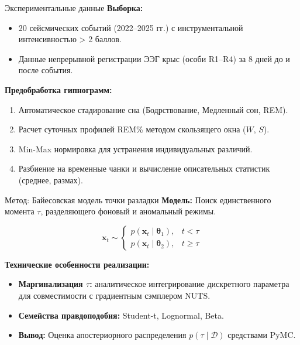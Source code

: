 \documentclass[12pt,aspectratio=169]{beamer}
\begin{document}
	\begin{frame}{Экспериментальные данные}
		\textbf{Выборка:}
		\begin{itemize}
			\item 20 сейсмических событий (2022--2025 гг.) с инструментальной интенсивностью > 2 баллов.
			\item Данные непрерывной регистрации ЭЭГ крыс (особи R1--R4) за 8 дней до и после события.
		\end{itemize}
		
		\vspace{0.3cm}
		\textbf{Предобработка гипнограмм:}
		\begin{enumerate}
			\item Автоматическое стадирование сна (Бодрствование, Медленный сон, REM).
			\item Расчет суточных профилей REM\% методом скользящего окна ($W$, $S$).
			\item Min-Max нормировка для устранения индивидуальных различий.
			\item Разбиение на временные чанки и вычисление описательных статистик (среднее, размах).
		\end{enumerate}
	\end{frame}
	
	\begin{frame}{Метод: Байесовская модель точки разладки}
		\textbf{Модель:} Поиск единственного момента $\tau$, разделяющего фоновый и аномальный режимы.
		
		\vspace{0.2cm}
		\[
		\mathbf{x}_t \sim 
		\begin{cases}
			p(\mathbf{x}_t \mid \boldsymbol{\theta}_1), & t < \tau \\
			p(\mathbf{x}_t \mid \boldsymbol{\theta}_2), & t \geq \tau
		\end{cases}
		\]
		
		\vspace{0.2cm}
		\textbf{Технические особенности реализации:}
		\begin{itemize}
			\item \textbf{Маргинализация $\tau$:} аналитическое интегрирование дискретного параметра для совместимости с градиентным сэмплером NUTS.
			\item \textbf{Семейства правдоподобия:} Student-t, Lognormal, Beta.
			\item \textbf{Вывод:} Оценка апостериорного распределения $p(\tau \mid \mathcal{D})$ средствами PyMC.
		\end{itemize}
	\end{frame}
	
\end{document}
